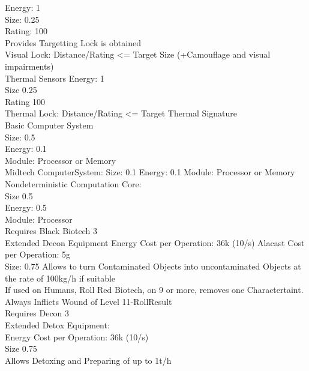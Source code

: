 \documentclass{article}
\begin{document}
    Energy: 1\\
    Size: 0.25 \\
    Rating: 100\\
    Provides Targetting Lock is obtained\\
    Visual Lock: Distance/Rating <= Target Size (+Camouflage and visual impairments)\\
    \newline
    Thermal Sensors
    Energy: 1\\
    Size 0.25\\
    Rating 100\\
    Thermal Lock: Distance/Rating <= Target Thermal Signature\\
    \newline
    Basic Computer System\\
    Size: 0.5\\
    Energy: 0.1\\
    Module: Processor or Memory\\
    \newline
    Midtech \newline
    ComputerSystem:
    Size: 0.1
    Energy: 0.1
    Module: Processor or Memory\\
    \newline
    Nondeterministic Computation Core:\\
    Size 0.5\\
    Energy: 0.5\\
    Module: Processor\\
    Requires Black Biotech 3\\
    \newline
    Extended Decon Equipment
    Energy Cost per Operation: 36k (10/s)
    Alacast Cost per Operation: 5g\\
    Size: 0.75
    Allows to turn Contaminated Objects into uncontaminated Objects at the rate of 100kg/h if suitable\\
    If used on Humans, Roll Red Biotech, on 9 or more, removes one Charactertaint.\\
    Always Inflicts Wound of Level 11-RollResult\\
    Requires Decon 3\\
    \newline
    Extended Detox Equipment:\\
    Energy Cost per Operation: 36k (10/s)\\
    Size 0.75\\
    Allows Detoxing and Preparing of up to 1t/h\\
\end{document}
